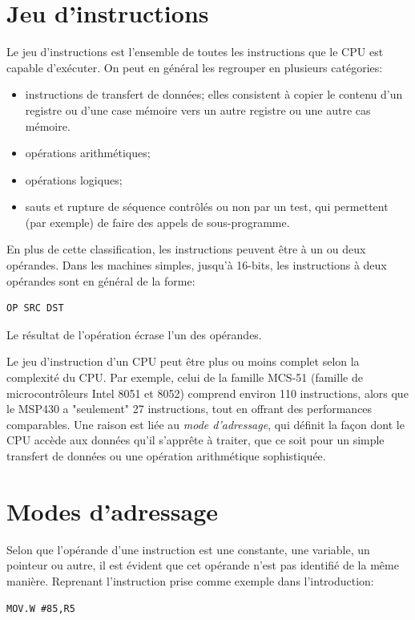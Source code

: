 \section{Jeu d'instructions}
Le jeu d'instructions est l'ensemble de toutes les instructions que le CPU est capable d'exécuter. On peut en général les regrouper en plusieurs catégories:
\begin{itemize}[label=\textbullet,font=\small]
\item instructions de transfert de données; elles consistent à copier le contenu d'un registre ou d'une case mémoire vers un autre registre ou une autre cas mémoire.
\item opérations arithmétiques;
\item opérations logiques;
\item sauts et rupture de séquence contrôlés ou non par un test, qui permettent (par exemple) de faire des appels de sous-programme.
\end{itemize}

En plus de cette classification, les instructions peuvent être à un ou deux opérandes. Dans les machines simples, jusqu'à 16-bits, les instructions à deux opérandes sont en général de la forme:
\lstset{style=customc}
\begin{lstlisting}
OP SRC DST
\end{lstlisting}
Le résultat de l'opération écrase l'un des opérandes.

\bigskip
Le jeu d'instruction d'un CPU peut être plus ou moins complet selon la complexité du CPU. Par exemple, celui de la famille MCS-51 (famille de microcontrôleurs Intel 8051 et 8052) comprend environ 110 instructions, alors que le MSP430 a "seulement" 27 instructions, tout en offrant des performances comparables.
Une raison est liée au \textit{mode d'adressage}, qui définit la façon dont le CPU accède aux données qu'il s'apprête à traiter, que ce soit pour un simple transfert de données ou une opération arithmétique sophistiquée.

\section{Modes d'adressage}
Selon que l'opérande d'une instruction est une constante, une variable, un pointeur ou autre, il est évident que cet opérande n'est pas identifié de la même manière.
Reprenant l'instruction prise comme exemple dans l'introduction:
\lstset{style=customc}
\begin{lstlisting}
MOV.W #85,R5
\end{lstlisting}

